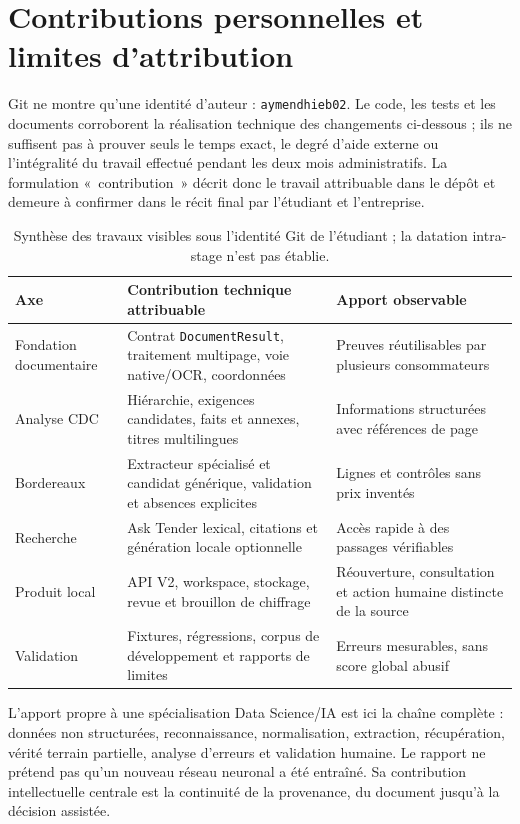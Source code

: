 \section{Contributions personnelles et limites d'attribution}
Git ne montre qu'une identité d'auteur : \texttt{aymendhieb02}. Le code, les tests et les documents corroborent la réalisation technique des changements ci-dessous ; ils ne suffisent pas à prouver seuls le temps exact, le degré d'aide externe ou l'intégralité du travail effectué pendant les deux mois administratifs. La formulation «~contribution~» décrit donc le travail attribuable dans le dépôt et demeure à confirmer dans le récit final par l'étudiant et l'entreprise.

\begin{table}[htbp]\centering\tighttable
\begin{tabularx}{\textwidth}{@{}p{30mm}Y Y@{}}\toprule
Axe & Contribution technique attribuable & Apport observable\\\midrule
Fondation documentaire & Contrat \texttt{DocumentResult}, traitement multipage, voie native/OCR, coordonnées & Preuves réutilisables par plusieurs consommateurs\\
Analyse CDC & Hiérarchie, exigences candidates, faits et annexes, titres multilingues & Informations structurées avec références de page\\
Bordereaux & Extracteur spécialisé et candidat générique, validation et absences explicites & Lignes et contrôles sans prix inventés\\
Recherche & Ask Tender lexical, citations et génération locale optionnelle & Accès rapide à des passages vérifiables\\
Produit local & API V2, workspace, stockage, revue et brouillon de chiffrage & Réouverture, consultation et action humaine distincte de la source\\
Validation & Fixtures, régressions, corpus de développement et rapports de limites & Erreurs mesurables, sans score global abusif\\\bottomrule
\end{tabularx}
\caption{Synthèse des travaux visibles sous l'identité Git de l'étudiant ; la datation intra-stage n'est pas établie.}\label{tab:contributions}
\end{table}

L'apport propre à une spécialisation Data Science/IA est ici la chaîne complète : données non structurées, reconnaissance, normalisation, extraction, récupération, vérité terrain partielle, analyse d'erreurs et validation humaine. Le rapport ne prétend pas qu'un nouveau réseau neuronal a été entraîné. Sa contribution intellectuelle centrale est la continuité de la provenance, du document jusqu'à la décision assistée.
